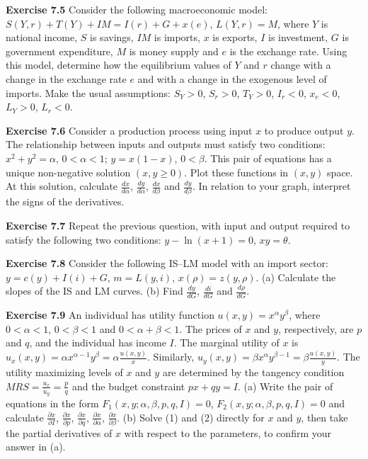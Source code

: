 \begin{original}
\textbf{Exercise 7.5} Consider the following macroeconomic model: $S(Y, r) + T(Y) + IM = I(r) + G + x(e)$, $L(Y, r) = M$, where $Y$ is national income, $S$ is savings, $IM$ is imports, $x$ is exports, $I$ is investment, $G$ is government expenditure, $M$ is money supply and $e$ is the exchange rate. Using this model, determine how the equilibrium values of $Y$ and $r$ change with a change in the exchange rate $e$ and with a change in the exogenous level of imports. Make the usual assumptions: $S_Y > 0$, $S_r > 0$, $T_Y > 0$, $I_r < 0$, $x_e < 0$, $L_Y > 0$, $L_r < 0$.

\textbf{Exercise 7.6} Consider a production process using input $x$ to produce output $y$. The relationship between inputs and outputs must satisfy two conditions: $x^2 + y^2 = \alpha$, $0 < \alpha < 1$; $y = x(1 - x)$, $0 < \beta$. This pair of equations has a unique non-negative solution $(x, y \ge 0)$. Plot these functions in $(x, y)$ space. At this solution, calculate $\frac{dx}{d\alpha}$, $\frac{dy}{d\alpha}$, $\frac{dx}{d\beta}$ and $\frac{dy}{d\beta}$. In relation to your graph, interpret the signs of the derivatives.

\textbf{Exercise 7.7} Repeat the previous question, with input and output required to satisfy the following two conditions: $y - \ln(x + 1) = 0$, $x y = \theta$.

\textbf{Exercise 7.8} Consider the following IS--LM model with an import sector: $y = c(y) + I(i) + G$, $m = L(y, i)$, $x(\rho) = z(y, \rho)$. (a) Calculate the slopes of the IS and LM curves. (b) Find $\frac{dy}{dG}$, $\frac{di}{dG}$ and $\frac{d\rho}{dG}$.

\textbf{Exercise 7.9} An individual has utility function $u(x, y) = x^\alpha y^\beta$, where $0 < \alpha < 1$, $0 < \beta < 1$ and $0 < \alpha + \beta < 1$. The prices of $x$ and $y$, respectively, are $p$ and $q$, and the individual has income $I$. The marginal utility of $x$ is $u_x(x, y) = \alpha x^{\alpha-1} y^\beta = \alpha \frac{u(x,y)}{x}$. Similarly, $u_y(x, y) = \beta x^\alpha y^{\beta-1} = \beta \frac{u(x,y)}{y}$. The utility maximizing levels of $x$ and $y$ are determined by the tangency condition $MRS = \frac{u_x}{u_y} = \frac{p}{q}$ and the budget constraint $px + qy = I$. (a) Write the pair of equations in the form $F_1(x, y; \alpha, \beta, p, q, I) = 0$, $F_2(x, y; \alpha, \beta, p, q, I) = 0$ and calculate $\frac{\partial x}{\partial I}$, $\frac{\partial x}{\partial p}$, $\frac{\partial x}{\partial q}$, $\frac{\partial x}{\partial \alpha}$, $\frac{\partial x}{\partial \beta}$. (b) Solve (1) and (2) directly for $x$ and $y$, then take the partial derivatives of $x$ with respect to the parameters, to confirm your answer in (a).


\end{original}
